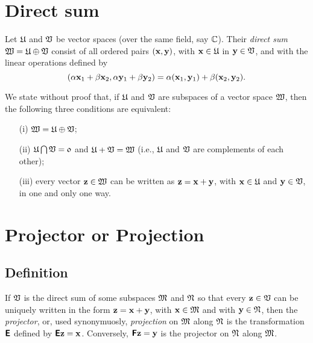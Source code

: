 \section{Direct sum}

Let
${\frak U}$
and
${\frak V}$
be vector spaces (over the same field, say ${\Bbb C}$).
Their {\em direct sum}
${\frak W}={\frak U}\oplus{\frak V}$
consist of all ordered pairs
$({\bf x},{\bf y})$, with
${\bf x}\in {\frak U}$ in
${\bf y}\in {\frak V}$,
and with the linear operations defined by
\begin{equation}
(
\alpha {\bf x}_1 +\beta {\bf x}_2
,
\alpha {\bf y}_1 +\beta {\bf y}_2
)
=
\alpha  ({\bf x}_1,{\bf y}_1)
+
\beta   ({\bf x}_2,{\bf y}_2).
\end{equation}

We state without proof that,
if
${\frak U}$
and
${\frak V}$
are subspaces of a vector space
${\frak W}$,
then the following three conditions are equivalent:
\begin{itemize}
\item[(i)]
${\frak W}={\frak U}\oplus{\frak V}$;
\item[(ii)]
${\frak U}\bigcap{\frak V}={\frak 0}$
and
${\frak U}+{\frak V}={\frak W}$
(i.e., ${\frak U}$
and
${\frak V}$
are complements of each other);
\item[(iii)]
every vector ${\bf z}\in {\frak W}$ can be written as
${\bf z}={\bf x}+{\bf y}$, with
${\bf x}\in {\frak U}$  and
${\bf y}\in {\frak V}$, in one and only one way.
\end{itemize}

\section{Projector or Projection}
\label{2011-m-projec}

\subsection{Definition}
If ${\frak V}$ is the direct sum of some subspaces
${\frak M}$
and
${\frak N}$
so that every ${\bf z} \in {\frak V}$ can be uniquely written in the form
$
{\bf z}
=
{\bf x}
+
{\bf y}
$, with
${\bf x} \in {\frak M}$
and with
${\bf y} \in {\frak N}$,
then
the {\em projector}, or, used synonymuosly,
{\em projection}
on ${\frak M}$
along ${\frak N}$ is the transformation $\textsf{\textbf{E}}$
defined by $\textsf{\textbf{E}}{\bf z}={\bf x}$.
Conversely,
 $\textsf{\textbf{F}}{\bf z}={\bf y}$  is the projector
on ${\frak N}$
along ${\frak M}$.

